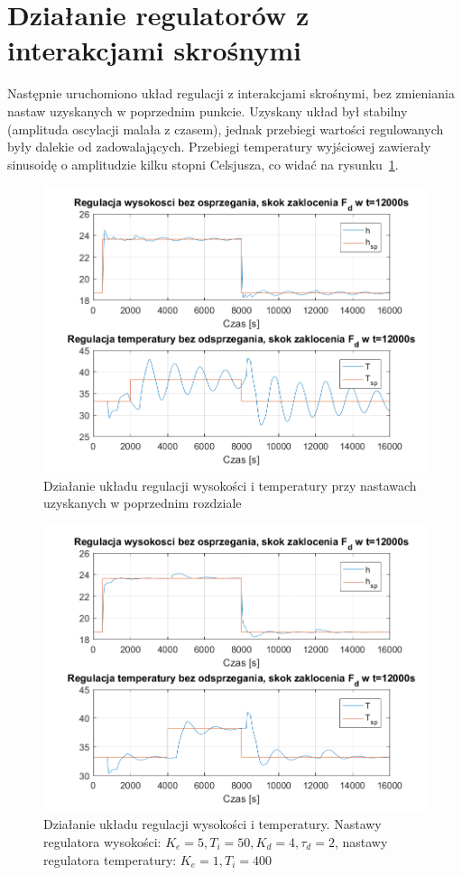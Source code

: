 \documentclass{article}
\begin{document}
\FloatBarrier
\section{Działanie regulatorów z interakcjami skrośnymi}
Następnie uruchomiono układ regulacji z interakcjami skrośnymi, bez zmieniania nastaw uzyskanych w poprzednim punkcie. Uzyskany układ był stabilny (amplituda oscylacji malała z czasem), jednak przebiegi wartości regulowanych były dalekie od zadowalających. Przebiegi temperatury wyjściowej zawierały sinusoidę o amplitudzie kilku stopni Celsjusza, co widać na rysunku~\ref{fig::pid_hT_nodec_bad}.
\begin{figure}[htb]
	\centering
	\includegraphics[width=\textwidth]{pid_hT_nodec_bad.PNG}
	\caption{Działanie układu regulacji wysokości i temperatury przy nastawach uzyskanych w poprzednim rozdziale}
	\label{fig::pid_hT_nodec_bad}
\end{figure}
\begin{figure}[htb]
	\centering
	\includegraphics[width=\textwidth]{pid_hT_nodec.PNG}
	\caption{Działanie układu regulacji wysokości i temperatury. Nastawy regulatora wysokości: $K_e = 5, T_i = 50, K_d=4, \tau_d=2$, nastawy regulatora temperatury: $K_e = 1, T_i = 400$}
	\label{fig::pid_hT_nodec}
\end{figure}
\end{document}
